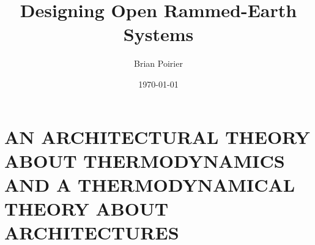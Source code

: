 \documentclass{article}
\begin{document}
\title{Designing Open Rammed-Earth Systems}
\author{Brian Poirier}
\date{\today}
\maketitle
\clearpage

\tableofcontents
\clearpage



\clearpage

\section{AN ARCHITECTURAL THEORY ABOUT THERMODYNAMICS AND A THERMODYNAMICAL THEORY ABOUT ARCHITECTURES}


% 







\printbibliography
\end{document}
